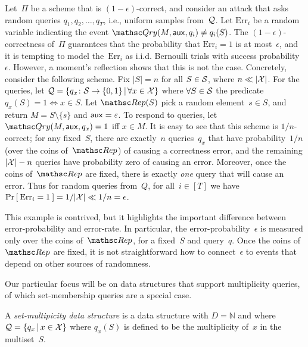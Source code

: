 \def\bin{{\sf Bin}}
Let~$\Pi$ be a scheme that is $(1-\epsilon)$-correct, and consider an attack that 
asks random queries $q_1,q_2,\ldots,q_T$, i.e., uniform samples from~${\cal Q}$.
Let $\mathrm{Err}_i$ be a random variable indicating the event $\Qry(M,\aux,q_i)\neq q_i(S)$.  
The $(1-\epsilon)$-correctness of~$\Pi$ guarantees that the probability that $\mathrm{Err}_i=1$ is at most~$\epsilon$, 
and it is tempting to model the~$\mathrm{Err}_i$ as i.i.d. Bernoulli trials with success probability~$\epsilon$.
However, a moment's reflection shows that this is not the case.  Concretely, consider the following scheme.  Fix $|S|=n$ for all $S \in {\cal S}$, where $n \ll |{\cal X}|$.  For the queries, let ${\cal Q} = \{q_x\colon {\cal S} \to \{0,1\} \,|\, \forall x \in {\cal X}\}$ where $\forall S \in {\cal S}$ the predicate $q_x(S)=1 \Leftrightarrow x \in S$.  Let $\Rep(S)$ pick a random element~$s \in S$, and return $M = S \setminus \{s\}$ and ${\sf aux} = \varepsilon$.  To respond to queries, let~$\Qry(M,\aux,q_x)=1$ iff $x \in M$.  It is easy to see that this scheme is $1/n$-correct; for any fixed~$S$, there are exactly~$n$ queries~$q_x$ that have probability~$1/n$  (over the coins of~$\Rep$) of causing a correctness error, and the remaining $|{\cal X}|-n$ queries have probability zero of causing an error.  Moreover, once the coins of~$\Rep$ are fixed, there is exactly \emph{one} query that will cause an error.  Thus for random queries from~$Q$, for all~$i\in[T]$ we have $\Pr\left[\: \mathrm{Err}_i=1 \:\right]=1/|{\cal X}| \ll 1/n = \epsilon$.

This example is contrived, but it highlights the important difference
between error-probability and error-rate.  In particular, the
error-probability~$\epsilon$ is measured only over the coins
of~$\Rep$, for a fixed~$S$ and query~$q$.
Once the coins of~$\Rep$ are fixed, it is not straightforward how to
connect~$\epsilon$ to events that depend on other sources of
randomness. 


Our particular focus will be on data structures that support multiplicity queries, of which set-membership queries are a special case.  
\begin{definition} A \emph{set-multipicity data structure} is a data structure with $D=\mathbb{N}$ and where ${\cal Q}=\{q_x \,|\, x \in {\cal X}\}$ where $q_x(S)$ is defined to be the multiplicity of~$x$ in the multiset~$S$.
\hfill\dqed
\end{definition}
%

